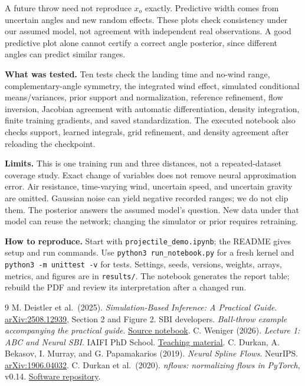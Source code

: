 \documentclass[11pt,a4paper]{article}
\begin{document}
A future throw need not reproduce $x_o$ exactly. Predictive width comes from
uncertain angles and new random effects. These plots check consistency under
our assumed model, not agreement with independent real observations. A good
predictive plot alone cannot certify a correct angle posterior, since different
angles can predict similar ranges.

\textbf{What was tested.}
Ten tests check the landing time and no-wind range, complementary-angle
symmetry, the integrated wind effect, simulated conditional means/variances,
prior support and normalization, reference refinement, flow inversion,
Jacobian agreement with automatic differentiation, density integration,
finite training gradients, and saved standardization. The executed notebook
also checks support, learned integrals, grid refinement, and density agreement
after reloading the checkpoint.

\textbf{Limits.}
This is one training run and three distances, not a repeated-dataset coverage
study. Exact change of variables does not remove neural approximation error.
Air resistance, time-varying wind, uncertain speed, and uncertain gravity are
omitted. Gaussian noise can yield negative recorded ranges; we do not clip them.
The posterior answers the assumed model's question. New data under that model
can reuse the network; changing the simulator or prior requires retraining.

\textbf{How to reproduce.}
Start with \texttt{projectile\_demo.ipynb}; the README gives setup and run commands.
Use \texttt{python3 run\_notebook.py} for a fresh kernel and
\texttt{python3 -m unittest -v} for tests. Settings, seeds, versions, weights,
arrays, metrics, and figures are in \texttt{results/}. The notebook generates the
report table; rebuild the PDF and review its interpretation after a changed run.

\begingroup
\small\raggedright
\begin{thebibliography}{9}
 M. Deistler et al.\ (2025). \emph{Simulation-Based Inference: A Practical Guide}.
\href{https://arxiv.org/abs/2508.12939}{arXiv:2508.12939}, Section 2 and Figure 2.
 SBI developers. \emph{Ball-throw example accompanying the practical guide}.
\href{https://github.com/sbi-dev/sbi-practical-guide/blob/main/examples/ball_throw.ipynb}{Source notebook}.
 C. Weniger (2026). \emph{Lecture 1: ABC and Neural SBI}. IAIFI PhD School.
\href{https://cweniger.github.io/teaching-2608-IAIFI/lecture1.html}{Teaching material}.
 C. Durkan, A. Bekasov, I. Murray, and G. Papamakarios (2019).
\emph{Neural Spline Flows}. NeurIPS. \href{https://arxiv.org/abs/1906.04032}{arXiv:1906.04032}.
 C. Durkan et al.\ (2020). \emph{nflows: normalizing flows in PyTorch}, v0.14.
\href{https://github.com/bayesiains/nflows}{Software repository}.
\end{thebibliography}
\endgroup
\end{document}
